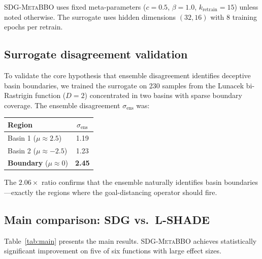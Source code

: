 \documentclass[preprint,12pt,authoryear]{elsarticle}
\newcommand{\sdg}{\textsc{SDG-MetaBBO}}
\newcommand{\sigmaens}{\sigma_{\text{ens}}}
\begin{document}
\sdg{} uses fixed meta-parameters ($c = 0.5$, $\beta = 1.0$, $k_{\text{retrain}} = 15$) unless noted otherwise. The surrogate uses hidden dimensions $(32, 16)$ with 8 training epochs per retrain.

\subsection{Surrogate disagreement validation}
\label{sec:surrogate_validation}

To validate the core hypothesis that ensemble disagreement identifies deceptive basin boundaries, we trained the surrogate on 230 samples from the Lunacek bi-Rastrigin function ($D = 2$) concentrated in two basins with sparse boundary coverage. The ensemble disagreement $\sigmaens$ was:

\begin{center}
\begin{tabular}{lc}
\toprule
Region & $\sigmaens$ \\
\midrule
Basin 1 ($\mu \approx 2.5$) & 1.19 \\
Basin 2 ($\mu \approx -2.5$) & 1.23 \\
\textbf{Boundary} ($\mu \approx 0$) & \textbf{2.45} \\
\bottomrule
\end{tabular}
\end{center}

The $2.06\times$ ratio confirms that the ensemble naturally identifies basin boundaries---exactly the regions where the goal-distancing operator should fire.

\subsection{Main comparison: SDG vs.\ L-SHADE}

Table~\ref{tab:main} presents the main results. \sdg{} achieves statistically significant improvement on five of six functions with large effect sizes.
\end{document}
